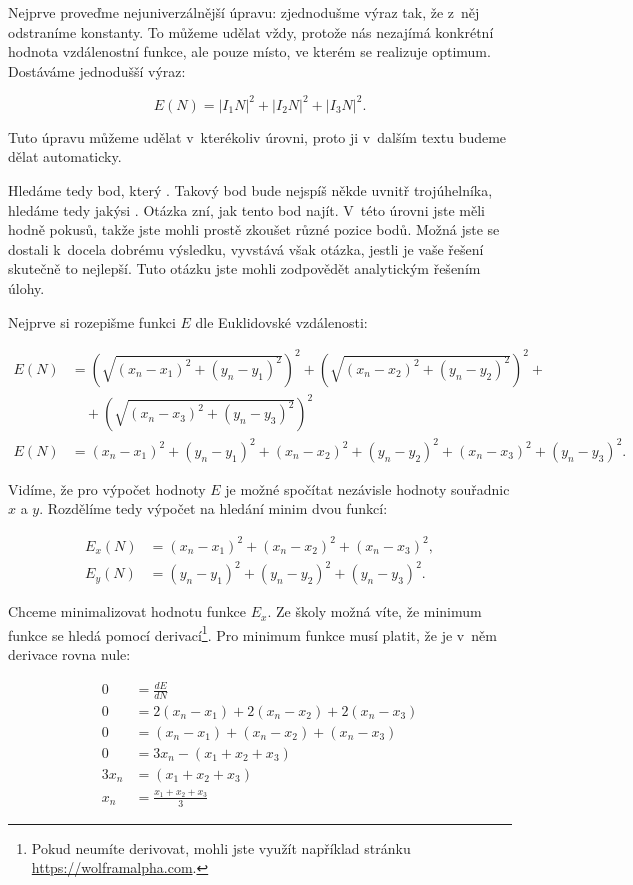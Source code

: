 \documentclass[12pt,a4paper]{article}
\begin{document}
Nejprve proveďme nejuniverzálnější úpravu: zjednodušme výraz tak, že z~něj
odstraníme konstanty. To můžeme udělat vždy, protože nás nezajímá konkrétní
hodnota vzdálenostní funkce, ale pouze místo, ve kterém se realizuje optimum.
Dostáváme jednodušší výraz:

$$E(N) = |I_1N|^2 + |I_2N|^2 + |I_3N|^2.$$

Tuto úpravu můžeme udělat v~kterékoliv úrovni, proto ji v~dalším textu budeme
dělat automaticky.

Hledáme tedy bod, který . Takový bod bude
nejspíš někde uvnitř trojúhelníka, hledáme tedy jakýsi . Otázka zní,
jak tento bod najít. V~této úrovni jste měli hodně pokusů, takže jste mohli
prostě zkoušet různé pozice bodů. Možná jste se dostali k~docela dobrému
výsledku, vyvstává však otázka, jestli je vaše řešení skutečně to nejlepší.
Tuto otázku jste mohli zodpovědět analytickým řešením úlohy.

Nejprve si rozepišme funkci $E$ dle Euklidovské vzdálenosti:

\begin{align}
E(N) &= \left(\sqrt{(x_n-x_1)^2 + (y_n - y_1)^2}\right)^2 +
	\left(\sqrt{(x_n-x_2)^2 + (y_n - y_2)^2}\right)^2 + \nonumber \\
	&\hspace{1em} + \left(\sqrt{(x_n-x_3)^2 + (y_n - y_3)^2}\right)^2 \nonumber \\
E(N) &= (x_n-x_1)^2 + (y_n - y_1)^2 +
	(x_n-x_2)^2 + (y_n - y_2)^2 +
	(x_n-x_3)^2 + (y_n - y_3)^2 \nonumber.
\end{align}

Vidíme, že pro výpočet hodnoty $E$ je možné spočítat nezávisle hodnoty souřadnic
$x$ a $y$. Rozdělíme tedy výpočet na hledání minim dvou funkcí:

\begin{align}
E_x(N) &= (x_n-x_1)^2 + (x_n-x_2)^2 + (x_n-x_3)^2 \nonumber, \\
E_y(N) &= (y_n-y_1)^2 + (y_n-y_2)^2 + (y_n-y_3)^2 \nonumber.
\end{align}

Chceme minimalizovat hodnotu funkce $E_x$. Ze školy možná víte, že minimum
funkce se hledá pomocí derivací\footnote{Pokud neumíte derivovat, mohli jste
využít například stránku \url{https://wolframalpha.com}.}. Pro minimum funkce musí
platit, že je v~něm derivace rovna nule:

\begin{align}
0 &= \frac{dE}{dN} \nonumber \\
0 &= 2(x_n-x_1) + 2(x_n-x_2) + 2(x_n-x_3) \nonumber \\
0 &= (x_n-x_1) + (x_n-x_2) + (x_n-x_3) \nonumber \\
0 &= 3x_n - (x_1 + x_2 + x_3) \nonumber \\
3x_n &= (x_1 + x_2 + x_3) \nonumber \\
x_n &= \frac{x_1 + x_2 + x_3}{3} \nonumber
\end{align}
\end{document}
